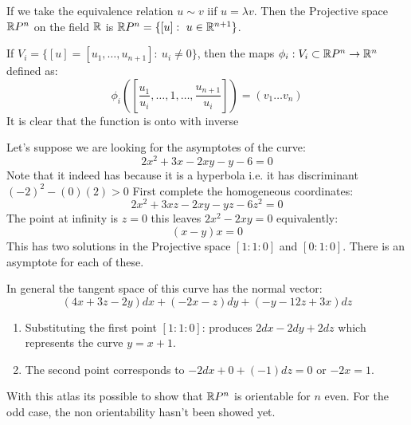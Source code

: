 \begin{ddef}
If we take the equivalence relation $u \sim v$ iif $u=\lambda v$. Then the Projective space $\mathbb{R} P^n$ on the field $\mathbb{R}$ is $\mathbb{R} P^n = \{ [u]:\ u\in \mathbb{R}^{n+1}\}$.
\end{ddef}

If $V_i = \{[u] = [u_1, \ldots , u_{n+1}]:\ u_i\neq 0\}$, then the maps $\phi_i : V_i\subset \mathbb{R} P^n \to \mathbb{R}^n$ defined as: 
    $$\phi_i(\left[ \frac{u_1}{u_i},\ldots ,1, \dots, \frac{u_{n+1}}{u_i} \right])= (v_1\ldots v_n)$$
It is clear that the function is onto with inverse
\begin{examples}
    Let's suppose we are looking for the asymptotes of the curve:
    $$2x^2 + 3x - 2xy -y -6 =0$$
    Note that it indeed has because it is a hyperbola i.e. it has discriminant $(-2)^2 - (0)(2)>0$
    First complete the homogeneous coordinates:
    $$2x^2 + 3xz - 2xy -yz -6z^2 =0$$
    The point at infinity is $z=0$ this leaves $2x^2 - 2xy = 0$ equivalently:
    $$(x-y)x=0$$
    This has two solutions in the Projective space $[1:1:0]$ and $[0:1:0]$. There is an asymptote for each of these.

    In general the tangent space of this curve has the normal vector:
    $$(4x+3z-2y)dx + (-2x-z)dy + (-y - 12z + 3x)dz$$
    \begin{enumerate}
        \item Substituting the first point $[1:1:0]$: produces $2dx - 2dy + 2dz$ which represents the curve $y=x+1$.
        \item The second point corresponds to $-2dx + 0 + (-1)dz=0$ or $-2x=1$.
    \end{enumerate}
\end{examples}
\begin{remarks}
With this atlas its possible to show that $\mathbb{R} P^n$ is orientable for $n$ even. For the odd case, the non 
orientability hasn't been showed yet.
\end{remarks}
